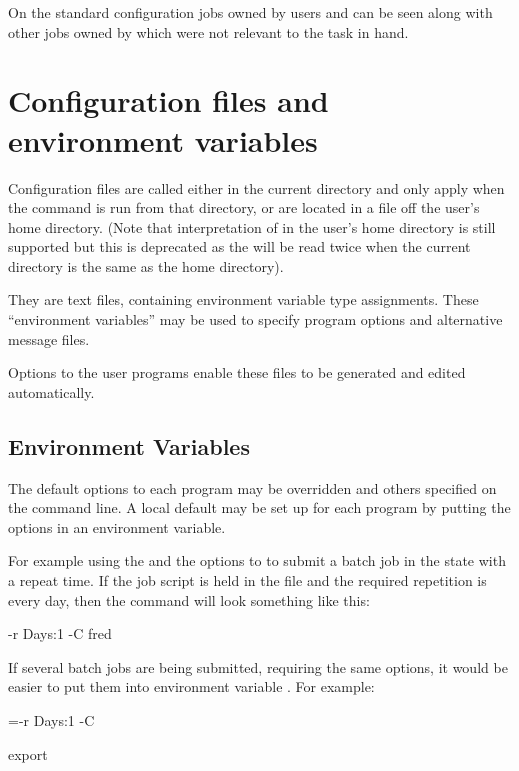 On the standard configuration jobs owned by users  and  can be seen along with other jobs
owned by  which were not relevant to the task in hand.

\section{Configuration files and environment variables}
Configuration files are called either \configurationfile{} in the current directory and only apply when
the command is run from that directory, or are located in a file \homeconfigpath{} off the user's home directory.
(Note that interpretation of \configurationfile{} in the user's home directory is still supported but this is deprecated as
the \configurationfile{} will be read twice when the current directory is the same as the home directory).

They are text files, containing environment variable type assignments. These ``environment variables''
may be used to specify program options and alternative message files.

Options to the user programs enable these files to be generated and edited automatically.

\subsection{Environment Variables}
The default options to each program may be overridden and others specified on the command line. A local default may be set up for each
program by putting the options in an environment variable.

For example using the  and the  options to \PrBtr{} to
submit a batch job in the  state with a repeat time. If the job script is held in the file
 and the required repetition is every day, then the \PrBtr{} command will look something like
this:

\begin{expara}

\BtrName{} -r Days:1 -C fred

\end{expara}

If several batch jobs are being submitted, requiring the same options, it would be easier to put them into environment variable
\filename{\BtrVarname}. For example:

\begin{expara}

\BtrVarname={\textquotesingle}-r Days:1 -C{\textquotesingle}

export \BtrVarname{}

\end{expara}

